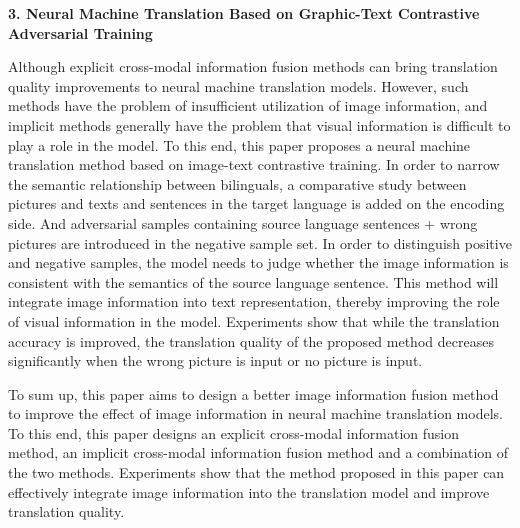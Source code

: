 \textbf{3. Neural Machine Translation Based on Graphic-Text Contrastive Adversarial Training}

Although explicit cross-modal information fusion methods can bring translation quality improvements to neural machine translation models. However, such methods have the problem of insufficient utilization of image information, and implicit methods generally have the problem that visual information is difficult to play a role in the model. To this end, this paper proposes a neural machine translation method based on image-text contrastive training. In order to narrow the semantic relationship between bilinguals, a comparative study between pictures and texts and sentences in the target language is added on the encoding side. And adversarial samples containing source language sentences + wrong pictures are introduced in the negative sample set. In order to distinguish positive and negative samples, the model needs to judge whether the image information is consistent with the semantics of the source language sentence. This method will integrate image information into text representation, thereby improving the role of visual information in the model. Experiments show that while the translation accuracy is improved, the translation quality of the proposed method decreases significantly when the wrong picture is input or no picture is input.

To sum up, this paper aims to design a better image information fusion method to improve the effect of image information in neural machine translation models. To this end, this paper designs an explicit cross-modal information fusion method, an implicit cross-modal information fusion method and a combination of the two methods. Experiments show that the method proposed in this paper can effectively integrate image information into the translation model and improve translation quality.

